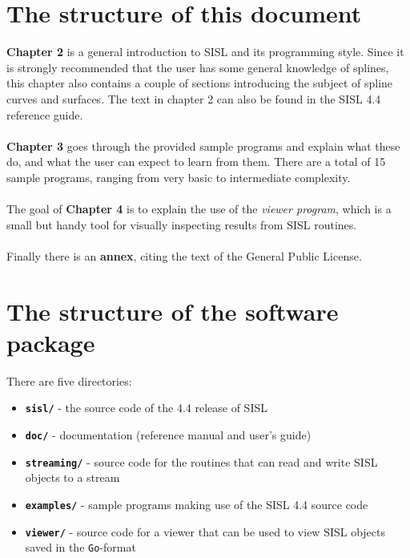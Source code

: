 \section{The structure of this document}
\textbf{Chapter 2} is a general introduction to SISL and its programming style.  Since
it is strongly recommended that the user has some general knowledge of splines, this 
chapter also contains a couple of sections introducing the subject of spline curves and
surfaces.  The text in chapter 2 can also be found in the SISL 4.4 reference guide.\\
\\
\textbf{Chapter 3} goes through the provided sample programs and explain what these do,
and what the user can expect to learn from them.  There are a total of 15 sample 
programs, ranging from very basic to intermediate complexity.\\
\\
The goal of \textbf{Chapter 4} is to explain the use of the \emph{viewer program}, 
which is a small but handy tool for visually inspecting results from SISL routines.\\
\\
Finally there is an \textbf{annex}, citing the text of the General Public License.

\section{The structure of the software package}\label{compile}
There are five directories:
\begin{itemize}
\item \textbf{\verb-sisl/-} - the source code of the 4.4 release of SISL
\item \textbf{\verb-doc/-} - documentation (reference manual and user's guide)
\item \textbf{\verb-streaming/-} - source code for the routines that can read and write
SISL objects to a stream
\item \textbf{\verb-examples/-} - sample programs making use of the SISL 4.4 source code
\item \textbf{\verb-viewer/-} - source code for a viewer that can be used to view SISL 
objects saved in the \verb/Go/-format
\end{itemize}

